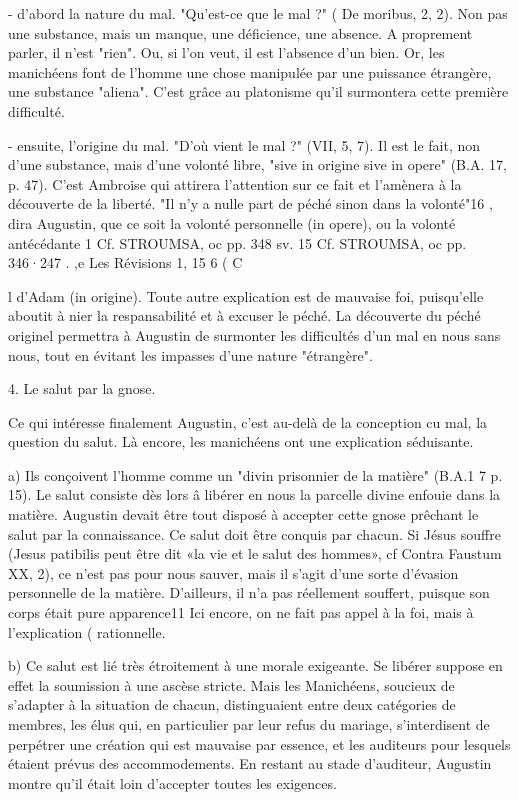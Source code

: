 -	d'abord la nature du mal. "Qu'est-ce que le mal ?" ( De moribus, 2, 2). Non pas une substance, mais un manque, une déficience, une absence. A proprement parler, il n'est "rien". Ou, si l'on veut, il est l'absence d'un bien.  Or, les manichéens font de l'homme une chose manipulée par une puissance étrangère, une substance "aliena". C'est grâce au platonisme qu'il surmontera cette première difficulté.

-	ensuite,  l'origine  du  mal. "D'où vient le mal ?" (VII, 5, 7). Il est le fait, non d'une substance, mais d'une volonté libre, "sive in origine sive in opere" (B.A. 17, p. 47).  C'est Ambroise qui attirera l'attention sur ce fait et l'amènera à la découverte de la liberté. "Il n'y a nulle part de péché sinon dans la volonté"16 , dira Augustin, que ce soit la volonté personnelle (in opere), ou la volonté antécédante
1  Cf. STROUMSA, oc pp. 348 sv.
15 Cf. STROUMSA, oc pp. 346·247 .
,e Les Révisions 1, 15
6
(	C
 
 




l
d'Adam (in origine). Toute autre explication est de mauvaise foi, puisqu'elle aboutit à
nier la respansabilité et à excuser le péché. La découverte du péché originel permettra à Augustin de surmonter les difficultés d'un mal en nous sans nous, tout en évitant les impasses d'une nature "étrangère".

4.	Le salut par la gnose.

Ce qui intéresse finalement Augustin, c'est au-delà de la conception cu mal, la question du salut. Là encore, les manichéens ont une explication séduisante.

a)	Ils conçoivent l'homme comme un "divin prisonnier de la matière" (B.A.1 7 p. 15).  Le  salut  consiste  dès  lors  â  libérer  en  nous  la  parcelle  divine enfouie dans la matière. Augustin devait être tout disposé à accepter cette gnose prêchant le salut par la connaissance. Ce salut doit être conquis par chacun. Si Jésus souffre  (Jesus patibilis peut être dit «la vie et le salut des hommes», cf Contra
Faustum XX, 2), ce n'est pas pour nous sauver, mais il s'agit d'une sorte d'évasion personnelle de la matière. D'ailleurs, il n'a pas réellement souffert, puisque son corps
était pure apparence11  	Ici encore, on ne fait pas appel à la foi, mais à l'explication	(
rationnelle.

b)	Ce salut est lié très étroitement à une morale  exigeante. Se libérer suppose en effet la soumission à une ascèse stricte. Mais les Manichéens, soucieux de s'adapter à la situation de chacun, distinguaient entre deux catégories de membres, les élus qui, en particulier par leur refus du mariage, s'interdisent de perpétrer une création qui est mauvaise par essence, et les auditeurs pour lesquels étaient prévus des accommodements. En restant au stade d'auditeur, Augustin montre qu'il était loin d'accepter toutes les exigences.

